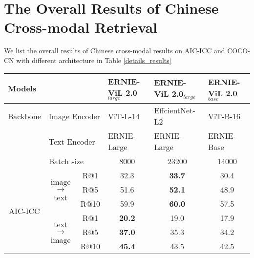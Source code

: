 \documentclass{article}
\begin{document}
\section{The Overall Results of Chinese Cross-modal Retrieval }
\label{overall_results}
We list the overall results of Chinese cross-modal results on AIC-ICC and COCO-CN with different architecture in Table \ref{details_results}
\begin{table}[]

\centering

\begin{tabular}{@{}cccccc@{}}
\toprule
\multicolumn{1}{l}{Models} & \multicolumn{2}{l}{} & \multicolumn{1}{l}{ERNIE-ViL 2.0$_{large}$} & \multicolumn{1}{l}{ERNIE-ViL 2.0$_{large}$} & \multicolumn{1}{l}{ERNIE-ViL 2.0$_{base}$} \\ \midrule
\multicolumn{1}{l|}{Backbone} & \multicolumn{2}{l|}{Image Encoder} & \multicolumn{1}{l|}{ViT-L-14} & \multicolumn{1}{l|}{EffcientNet-L2} & \multicolumn{1}{l}{ViT-B-16} \\ \cmidrule(l){2-6} 
\multicolumn{1}{l|}{} & \multicolumn{2}{l|}{Text    Encoder} & \multicolumn{1}{l|}{ERNIE-Large} & \multicolumn{1}{l|}{ERNIE-Large} & \multicolumn{1}{l}{ERNIE-Base}  \\ \midrule
\multicolumn{1}{l|}{} & \multicolumn{2}{l|}{Batch size} & \multicolumn{1}{c|}{8000} & \multicolumn{1}{c|}{23200} & \multicolumn{1}{c}{14000}  \\ \midrule
\multicolumn{1}{c|}{\multirow{7}{*}{AIC-ICC}} & \multirow{3}{*}{image$\to$text} & \multicolumn{1}{c|}{R@1} & \multicolumn{1}{c|}{32.3} & \multicolumn{1}{c|}{\textbf{33.7}} & \multicolumn{1}{c}{30.4}  \\
\multicolumn{1}{c|}{} &  & \multicolumn{1}{c|}{R@5} & \multicolumn{1}{c|}{51.6} & \multicolumn{1}{c|}{\textbf{52.1}} & \multicolumn{1}{c}{48.9}  \\
\multicolumn{1}{c|}{} &  & \multicolumn{1}{c|}{R@10} & \multicolumn{1}{c|}{59.9} & \multicolumn{1}{c|}{\textbf{60.0}} & \multicolumn{1}{c}{57.5}  \\ \cmidrule(l){2-6} 
\multicolumn{1}{c|}{} & \multirow{3}{*}{text$\to$image} & \multicolumn{1}{c|}{R@1} & \multicolumn{1}{c|}{\textbf{20.2}} & \multicolumn{1}{c|}{19.0} & \multicolumn{1}{c}{17.9}  \\
\multicolumn{1}{c|}{} &  & \multicolumn{1}{c|}{R@5} & \multicolumn{1}{c|}{\textbf{37.0}} & \multicolumn{1}{c|}{35.3} & \multicolumn{1}{c}{34.2}  \\
\multicolumn{1}{c|}{} &  & \multicolumn{1}{c|}{R@10} & \multicolumn{1}{c|}{\textbf{45.4}} & \multicolumn{1}{c|}{43.5} & \multicolumn{1}{c}{42.5}   \\ \midrule

\end{tabular}
\end{table}
\end{document}
